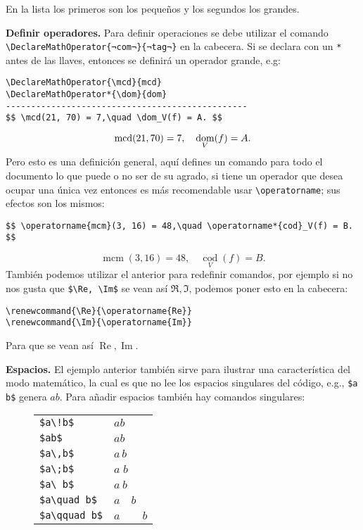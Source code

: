 En la lista los primeros son los pequeños y los segundos los grandes.

\textbf{Definir operadores.} Para definir operaciones se debe utilizar el comando \lstinline|\DeclareMathOperator{¬com¬}{¬tag¬}| en la cabecera. Si se declara con un \texttt{*} antes de las llaves, entonces se definirá un operador grande, e.g:
\begin{lstlisting}
\DeclareMathOperator{\mcd}{mcd}
\DeclareMathOperator*{\dom}{dom}
------------------------------------------------
$$ \mcd(21, 70) = 7,\quad \dom_V(f) = A. $$
\end{lstlisting}
$$ \mcd(21, 70) = 7,\quad \dom_V(f) = A. $$
Pero esto es una definición general, aquí defines un comando para todo el documento lo que puede o no ser de su agrado, si tiene un operador que desea ocupar una única vez entonces es más recomendable usar \lstinline|\operatorname|; sus efectos son los mismos:
\begin{lstlisting}
$$ \operatorname{mcm}(3, 16) = 48,\quad \operatorname*{cod}_V(f) = B. $$
\end{lstlisting}
$$ \operatorname{mcm}(3, 16) = 48,\quad \operatorname*{cod}_V(f) = B. $$
También podemos utilizar el anterior para redefinir comandos, por ejemplo si no nos gusta que \lstinline|$\Re, \Im$| se vean así $\Re, \Im$, podemos poner esto en la cabecera:
\begin{lstlisting}
\renewcommand{\Re}{\operatorname{Re}}
\renewcommand{\Im}{\operatorname{Im}}
\end{lstlisting}
Para que se vean así $\operatorname{Re}, \operatorname{Im}$.

\textbf{Espacios.} El ejemplo anterior también sirve para ilustrar una característica del modo matemático, la cual es que no lee los espacios singulares del código, e.g., \lstinline|$a     b$| genera $a     b$. Para añadir espacios también hay comandos singulares:
\begin{figure}[!h]
	\centering
	\begin{tabular}{ll}
		\hline \hline
		\lstinline|$a\!b$|      & $a\!b$ \\
		\lstinline|$ab$|        & $ab$ \\
		\lstinline|$a\,b$|      & $a\,b$ \\
		\lstinline|$a\;b$|      & $a\;b$ \\
		\lstinline|$a\ b$|      & $a\ b$ \\
		\lstinline|$a\quad b$|  & $a\quad b$ \\
		\lstinline|$a\qquad b$| & $a\qquad b$ \\
		\hline \hline
	\end{tabular}
\end{figure}

